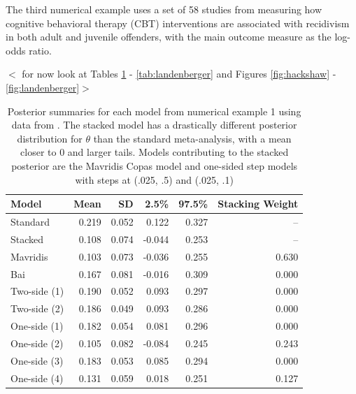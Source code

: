 \documentclass[12pt]{article}   	%
\numberwithin{equation}{section}
\begin{document}
The third numerical example uses a set of 58 studies from \citet{landenberger2005recidivism} measuring how cognitive behavioral therapy (CBT) interventions are associated with recidivism in both adult and juvenile offenders, with the main outcome measure as the log-odds ratio.

$< $ for now look at Tables \ref{tab:hackshaw} - \ref{tab:landenberger} and Figures \ref{fig:hackshaw} - \ref{fig:landenberger}$>$



\begin{table}[ht]
\centering
\begin{tabular}{lrrrrr}
  \hline
Model & Mean & SD & 2.5\% & 97.5\% & Stacking Weight \\ 
  \hline
Standard & 0.219 & 0.052 & 0.122 & 0.327 & -- \\ 
  Stacked & 0.108 & 0.074 & -0.044 & 0.253 & -- \\ 
  Mavridis & 0.103 & 0.073 & -0.036 & 0.255 & 0.630 \\ 
  Bai & 0.167 & 0.081 & -0.016 & 0.309 & 0.000 \\ 
  Two-side (1) & 0.190 & 0.052 & 0.093 & 0.297 & 0.000 \\ 
  Two-side (2) & 0.186 & 0.049 & 0.093 & 0.286 & 0.000 \\ 
  One-side (1) & 0.182 & 0.054 & 0.081 & 0.296 & 0.000 \\ 
  One-side (2) & 0.105 & 0.082 & -0.084 & 0.245 & 0.243 \\ 
  One-side (3) & 0.183 & 0.053 & 0.085 & 0.294 & 0.000 \\ 
  One-side (4) & 0.131 & 0.059 & 0.018 & 0.251 & 0.127 \\ 
   \hline
\end{tabular}
\caption{Posterior summaries for each model from numerical example 1 using data from \citet{hackshaw1997}. The stacked model has a drastically different posterior distribution for $\theta$ than the standard meta-analysis, with a mean closer to 0 and larger tails. Models contributing to the stacked posterior are the Mavridis Copas model and one-sided step models with steps at (.025, .5) and (.025, .1)}
\label{tab:hackshaw}
\end{table}
\end{document}
